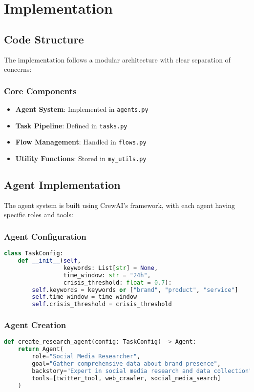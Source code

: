 \section{Implementation}

\subsection{Code Structure}
The implementation follows a modular architecture with clear separation of concerns:

\subsubsection{Core Components}
\begin{itemize}
    \item \textbf{Agent System}: Implemented in \texttt{agents.py}
    \item \textbf{Task Pipeline}: Defined in \texttt{tasks.py}
    \item \textbf{Flow Management}: Handled in \texttt{flows.py}
    \item \textbf{Utility Functions}: Stored in \texttt{my\_utils.py}
\end{itemize}

\subsection{Agent Implementation}
The agent system is built using CrewAI's framework, with each agent having specific roles and tools:

\subsubsection{Agent Configuration}
\begin{lstlisting}[language=Python]
class TaskConfig:
    def __init__(self, 
                 keywords: List[str] = None,
                 time_window: str = "24h",
                 crisis_threshold: float = 0.7):
        self.keywords = keywords or ["brand", "product", "service"]
        self.time_window = time_window
        self.crisis_threshold = crisis_threshold
\end{lstlisting}

\subsubsection{Agent Creation}
\begin{lstlisting}[language=Python]
def create_research_agent(config: TaskConfig) -> Agent:
    return Agent(
        role="Social Media Researcher",
        goal="Gather comprehensive data about brand presence",
        backstory="Expert in social media research and data collection",
        tools=[twitter_tool, web_crawler, social_media_search]
    )
\end{lstlisting}

